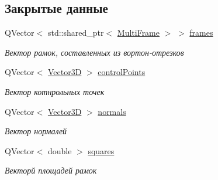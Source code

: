 \subsection*{Закрытые данные}
\begin{DoxyCompactItemize}
\item 
\mbox{\label{class_body_fragmentation_acaa44d72313bec6fb22af9e85268fbde}} 
Q\+Vector$<$ std\+::shared\+\_\+ptr$<$ \mbox{\hyperlink{class_multi_frame}{Multi\+Frame}} $>$ $>$ \mbox{\hyperlink{class_body_fragmentation_acaa44d72313bec6fb22af9e85268fbde}{frames}}
\begin{DoxyCompactList}\small\item\em Вектор рамок, составленных из вортон-\/отрезков \end{DoxyCompactList}\item 
\mbox{\label{class_body_fragmentation_a68ff3b27f313fa4f8b8bc7209a7c6da9}} 
Q\+Vector$<$ \mbox{\hyperlink{class_vector3_d}{Vector3D}} $>$ \mbox{\hyperlink{class_body_fragmentation_a68ff3b27f313fa4f8b8bc7209a7c6da9}{control\+Points}}
\begin{DoxyCompactList}\small\item\em Вектор котнрольных точек \end{DoxyCompactList}\item 
\mbox{\label{class_body_fragmentation_a636adca1ec65305257c4ffae191bcdde}} 
Q\+Vector$<$ \mbox{\hyperlink{class_vector3_d}{Vector3D}} $>$ \mbox{\hyperlink{class_body_fragmentation_a636adca1ec65305257c4ffae191bcdde}{normals}}
\begin{DoxyCompactList}\small\item\em Вектор нормалей \end{DoxyCompactList}\item 
\mbox{\label{class_body_fragmentation_a78380b602b04f5da842d49aaaa1e240a}} 
Q\+Vector$<$ double $>$ \mbox{\hyperlink{class_body_fragmentation_a78380b602b04f5da842d49aaaa1e240a}{squares}}
\begin{DoxyCompactList}\small\item\em Векторй площадей рамок \end{DoxyCompactList}\item 
\mbox{\label{class_body_fragmentation_a04437ab42965f8060a6d769bd696cd13}} 

\end{DoxyCompactItemize}
